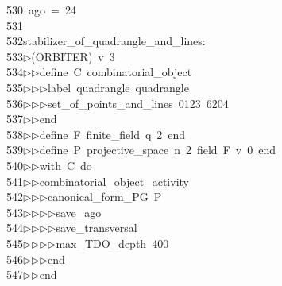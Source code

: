 \begin{tabbing}
530\>\ ago\ =\ 24\\[0pt]
531\>\\[0pt]
532\>stabilizer\_of\_quadrangle\_and\_lines:\\[0pt]
533\>$\triangleright$\>(ORBITER)\ v\ 3\ \\[0pt]
534\>$\triangleright$\>$\triangleright$\>define\ C\ combinatorial\_object\ \\[0pt]
535\>$\triangleright$\>$\triangleright$\>$\triangleright$\>label\ quadrangle\ quadrangle\ \\[0pt]
536\>$\triangleright$\>$\triangleright$\>$\triangleright$\>set\_of\_points\_and\_lines\ 0123\ 6204\ \\[0pt]
537\>$\triangleright$\>$\triangleright$\>end\ \\[0pt]
538\>$\triangleright$\>$\triangleright$\>define\ F\ finite\_field\ q\ 2\ end\ \\[0pt]
539\>$\triangleright$\>$\triangleright$\>define\ P\ projective\_space\ n\ 2\ field\ F\ v\ 0\ end\ \\[0pt]
540\>$\triangleright$\>$\triangleright$\>with\ C\ do\ \\[0pt]
541\>$\triangleright$\>$\triangleright$\>combinatorial\_object\_activity\ \\[0pt]
542\>$\triangleright$\>$\triangleright$\>$\triangleright$\>canonical\_form\_PG\ P\ \\[0pt]
543\>$\triangleright$\>$\triangleright$\>$\triangleright$\>$\triangleright$\>save\_ago\ \\[0pt]
544\>$\triangleright$\>$\triangleright$\>$\triangleright$\>$\triangleright$\>save\_transversal\ \\[0pt]
545\>$\triangleright$\>$\triangleright$\>$\triangleright$\>$\triangleright$\>max\_TDO\_depth\ 400\ \\[0pt]
546\>$\triangleright$\>$\triangleright$\>$\triangleright$\>end\ \\[0pt]
547\>$\triangleright$\>$\triangleright$\>end\ \\[0pt]

\end{tabbing}
